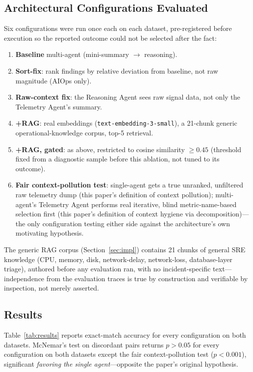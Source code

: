 \documentclass[10pt,conference]{IEEEtran}
\begin{document}
\subsection{Architectural Configurations Evaluated}
Six configurations were run once each on each dataset, pre-registered
before execution so the reported outcome could not be selected after the
fact:
\begin{enumerate}
  \item \textbf{Baseline} multi-agent (mini-summary $\to$ reasoning).
  \item \textbf{Sort-fix}: rank findings by relative deviation from
  baseline, not raw magnitude (AIOps only).
  \item \textbf{Raw-context fix}: the Reasoning Agent sees raw signal data,
  not only the Telemetry Agent's summary.
  \item \textbf{+RAG}: real embeddings (\texttt{text-embedding-3-small}), a
  21-chunk generic operational-knowledge corpus, top-5 retrieval.
  \item \textbf{+RAG, gated}: as above, restricted to cosine similarity
  $\geq 0.45$ (threshold fixed from a diagnostic sample before this
  ablation, not tuned to its outcome).
  \item \textbf{Fair context-pollution test}: single-agent gets a true
  unranked, unfiltered raw telemetry dump (this paper's definition of
  context pollution); multi-agent's Telemetry Agent performs real
  iterative, blind metric-name-based selection first (this paper's
  definition of context hygiene via decomposition)---the only configuration
  testing either side against the architecture's own motivating hypothesis.
\end{enumerate}
The generic RAG corpus (Section~\ref{sec:impl}) contains 21 chunks of
general SRE knowledge (CPU, memory, disk, network-delay, network-loss,
database-layer triage), authored before any evaluation ran, with no
incident-specific text---independence from the evaluation traces is true by
construction and verifiable by inspection, not merely asserted.

\subsection{Results}
Table~\ref{tab:results} reports exact-match accuracy for every
configuration on both datasets. McNemar's test \cite{mcnemar1947test} on
discordant pairs returns $p>0.05$ for every configuration on both datasets
except the fair context-pollution test ($p<0.001$), significant
\emph{favoring the single agent}---opposite the paper's original
hypothesis.
\end{document}
